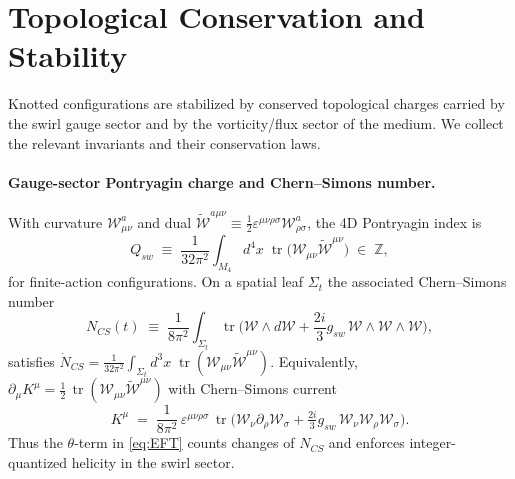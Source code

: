 \section{Topological Conservation and Stability}

Knotted configurations are stabilized by conserved topological charges carried by the swirl gauge sector and by the vorticity/flux sector of the medium. We collect the relevant invariants and their conservation laws.

\paragraph{Gauge-sector Pontryagin charge and Chern--Simons number.}
With curvature \(\mathcal{W}_{\mu\nu}^a\) and dual \(\tilde{\mathcal{W}}^{a\mu\nu} \equiv \tfrac12 \varepsilon^{\mu\nu\rho\sigma}\mathcal{W}^a_{\rho\sigma}\),
the 4D Pontryagin index is
\begin{equation}
 Q_{\!sw} \;\equiv\; \frac{1}{32\pi^2} \int_{M_4} \! d^4x\; \mathop{\mathrm{tr}}\!\big(\mathcal{W}_{\mu\nu}\tilde{\mathcal{W}}^{\mu\nu}\big) \;\in\; \mathbb{Z},
 \label{eq:Qsw}
\end{equation}
for finite-action configurations. On a spatial leaf \(\Sigma_t\) the associated Chern--Simons number
\begin{equation}
 N_{\!CS}(t) \;\equiv\; \frac{1}{8\pi^2} \int_{\Sigma_t} \mathop{\mathrm{tr}}\!\Big(\mathcal{W}\wedge d\mathcal{W} + \frac{2i}{3} g_{\!sw}\,\mathcal{W}\wedge\mathcal{W}\wedge\mathcal{W}\Big),
\end{equation}
satisfies \(\dot N_{\!CS}=\tfrac{1}{32\pi^2}\!\int_{\Sigma_t}\! d^3x\;\mathop{\mathrm{tr}}(\mathcal{W}_{\mu\nu}\tilde{\mathcal{W}}^{\mu\nu})\).
Equivalently,
\(\partial_\mu K^\mu=\tfrac12\,\mathop{\mathrm{tr}}(\mathcal{W}_{\mu\nu}\tilde{\mathcal{W}}^{\mu\nu})\)
with Chern--Simons current
\begin{equation}
 K^\mu \;=\; \frac{1}{8\pi^2}\,\varepsilon^{\mu\nu\rho\sigma}\,\mathop{\mathrm{tr}}\!\Big(\mathcal{W}_\nu\partial_\rho\mathcal{W}_\sigma + \tfrac{2i}{3} g_{\!sw}\,\mathcal{W}_\nu\mathcal{W}_\rho\mathcal{W}_\sigma\Big).
\end{equation}
Thus the \(\theta\)-term in \eqref{eq:EFT} counts changes of \(N_{\!CS}\) and enforces integer-quantized helicity in the swirl sector.

